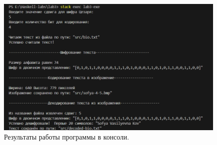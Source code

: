 \documentclass[11pt,a4paper,final]{article} %
\begin{document}
\newpage
\begin{figure}[h]
	\centering
	\includegraphics[width=0.75\linewidth]{img/res2.png}
	\caption{Результаты работы программы в консоли.}
	\label{fig:res2}
\end{figure}
\end{document}
